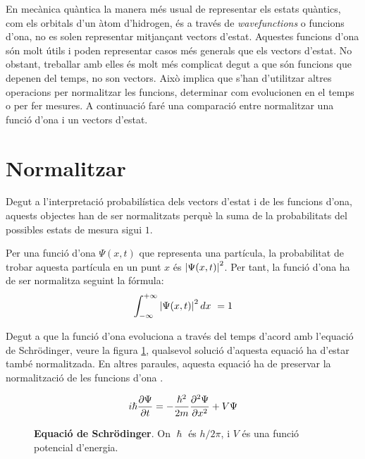 En mecànica quàntica la manera més usual de representar els estats quàntics, com els orbitals d'un àtom d'hidrogen, és a través de \textit{wavefunctions} o funcions d'ona, no es solen representar mitjançant vectors d'estat. Aquestes funcions d'ona són molt útils i poden representar casos més generals que els vectors d'estat. No obstant, treballar amb elles és molt més complicat degut a que són funcions que depenen del temps, no son vectors. Això implica que s'han d'utilitzar altres operacions per normalitzar les funcions, determinar com evolucionen en el temps o per fer mesures. A continuació faré una comparació entre normalitzar una funció d'ona i un vectors d'estat.

\section{Normalitzar}
Degut a l'interpretació probabilística dels vectors d'estat i de les funcions d'ona, aquests objectes han de ser normalitzats perquè la suma de la probabilitats del possibles estats de mesura sigui $1$. 

Per una funció d'ona $\Psi(x,t)$ que representa una partícula, la probabilitat de trobar aquesta partícula en un punt $x$ és $\abs{\Psi(x,t)}^2$. Per tant, la funció d'ona ha de ser normalitza seguint la fórmula: 
\begin{equation}
\int_{-\infty}^{+\infty}\abs{\Psi(x,t)}^2\, dx\ = 1
\label{eq:norm_wave}
\end{equation}

Degut a que la funció d'ona evoluciona a través del temps d'acord amb l'equació de Schrödinger, veure la figura \ref{fig:schro}, qualsevol solució d'aquesta equació ha d'estar també normalitzada. En altres paraules, aquesta equació ha de preservar la normalització de les funcions d'ona \cite{IntroQM:normalizing}.
\begin{figure}
	$$
	i\hslash \pdv{\Psi}{t} = -\frac{\hslash^2}{2m}\pdv[2]{\Psi}{x}+V\Psi
	$$
	\caption{\textbf{Equació de Schrödinger}. On $\hslash$ és $h/2\pi$, i $V$ és una funció potencial d'energia.}
	\label{fig:schro}
\end{figure}

